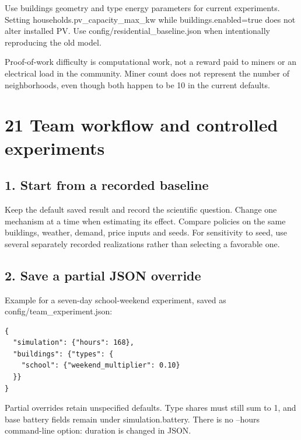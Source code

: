 \documentclass[a4paper,11pt]{article}
\begin{document}
Use buildings geometry and type energy parameters for current experiments. Setting households.pv\_capacity\_max\_kw while buildings.enabled=true does not alter installed PV. Use config/residential\_baseline.json when intentionally reproducing the old model.
\par\medskip

Proof-of-work difficulty is computational work, not a reward paid to miners or an electrical load in the community. Miner count does not represent the number of neighborhoods, even though both happen to be 10 in the current defaults.
\par\medskip

\clearpage

\section*{21  Team workflow and controlled experiments}
\par\medskip

\subsection*{1. Start from a recorded baseline}
\par\medskip

Keep the default saved result and record the scientific question. Change one mechanism at a time when estimating its effect. Compare policies on the same buildings, weather, demand, price inputs and seeds. For sensitivity to seed, use several separately recorded realizations rather than selecting a favorable one.
\par\medskip

\subsection*{2. Save a partial JSON override}
\par\medskip

Example for a seven-day school-weekend experiment, saved as config/team\_experiment.json:
\par\medskip

\begin{lstlisting}
{
  "simulation": {"hours": 168},
  "buildings": {"types": {
    "school": {"weekend_multiplier": 0.10}
  }}
}
\end{lstlisting}

Partial overrides retain unspecified defaults. Type shares must still sum to 1, and base battery fields remain under simulation.battery. There is no --hours command-line option: duration is changed in JSON.
\par\medskip
\end{document}
